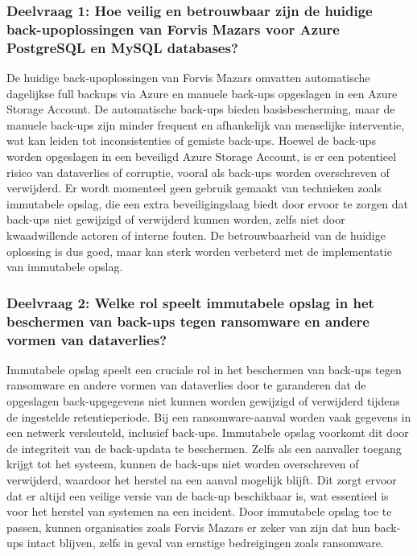 \subsubsection{Deelvraag 1: Hoe veilig en betrouwbaar zijn de huidige back-upoplossingen van Forvis Mazars voor Azure PostgreSQL en MySQL databases?}

De huidige back-upoplossingen van Forvis Mazars omvatten automatische dagelijkse full backups via Azure en manuele back-ups opgeslagen in een Azure Storage Account. De automatische back-ups bieden basisbescherming, maar de manuele back-ups zijn minder frequent en afhankelijk van menselijke interventie, wat kan leiden tot inconsistenties of gemiste back-ups. Hoewel de back-ups worden opgeslagen in een beveiligd Azure Storage Account, is er een potentieel risico van dataverlies of corruptie, vooral als back-ups worden overschreven of verwijderd. Er wordt momenteel geen gebruik gemaakt van technieken zoals immutabele opslag, die een extra beveiligingslaag biedt door ervoor te zorgen dat back-ups niet gewijzigd of verwijderd kunnen worden, zelfs niet door kwaadwillende actoren of interne fouten. De betrouwbaarheid van de huidige oplossing is dus goed, maar kan sterk worden verbeterd met de implementatie van immutabele opslag.

\subsubsection{Deelvraag 2: Welke rol speelt immutabele opslag in het beschermen van back-ups tegen ransomware en andere vormen van dataverlies?}

Immutabele opslag speelt een cruciale rol in het beschermen van back-ups tegen ransomware en andere vormen van dataverlies door te garanderen dat de opgeslagen back-upgegevens niet kunnen worden gewijzigd of verwijderd tijdens de ingestelde retentieperiode. Bij een ransomware-aanval worden vaak gegevens in een netwerk versleuteld, inclusief back-ups. Immutabele opslag voorkomt dit door de integriteit van de back-updata te beschermen. Zelfs als een aanvaller toegang krijgt tot het systeem, kunnen de back-ups niet worden overschreven of verwijderd, waardoor het herstel na een aanval mogelijk blijft. Dit zorgt ervoor dat er altijd een veilige versie van de back-up beschikbaar is, wat essentieel is voor het herstel van systemen na een incident. Door immutabele opslag toe te passen, kunnen organisaties zoals Forvis Mazars er zeker van zijn dat hun back-ups intact blijven, zelfs in geval van ernstige bedreigingen zoals ransomware.


